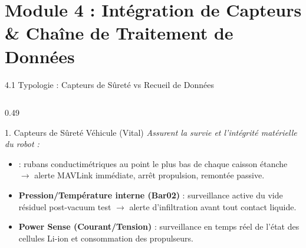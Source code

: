 
\section{Module 4 : Intégration de Capteurs \& Chaîne de Traitement de Données}

\begin{frame}{4.1 Typologie : Capteurs de Sûreté vs Recueil de Données}
  \begin{columns}[T]
    \begin{column}{0.49\textwidth}
      \begin{alertblock}{1. Capteurs de Sûreté Véhicule (Vital)}
        \scriptsize
        \textit{Assurent la survie et l'intégrité matérielle du robot :}
        \begin{itemize}
          \item {} : rubans conductimétriques au point le plus bas de chaque caisson étanche $\rightarrow$ alerte MAVLink immédiate, arrêt propulsion, remontée passive.
          \item \textbf{Pression/Température interne (Bar02)} : surveillance active du vide résiduel post-vacuum test $\rightarrow$ alerte d'infiltration avant tout contact liquide.
          \item \textbf{Power Sense (Courant/Tension)} : surveillance en temps réel de l'état des cellules Li-ion et consommation des propulseurs.
        \end{itemize}
      \end{alertblock}
    \end{column}


\end{columns}
\end{frame}
